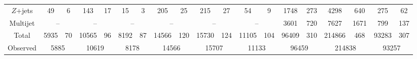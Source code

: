 \begin{table}[tbp]
\begin{center}
{\begin{tabular}{| c | c@{\ $\pm$\ }c c@{\ $\pm$\ }c c@{\ $\pm$\ }c | c@{\ $\pm$\ }c  c@{\ $\pm$\ }c c@{\ $\pm$\ }c | c@{\ $\pm$\ }c  c@{\ $\pm$\ }c c@{\ $\pm$\ }c |}
				$Z$+jets&                     49 &           6&                    143 &          17&                     15 &           3&                    205 &          25&                    215 &          27&                     54 &           9&                   1748 &         273&                   4298 &         640&                    275 &          62\\
				Multijet&\multicolumn{2}{c}{   --}             &\multicolumn{2}{c}{   --}             &\multicolumn{2}{c|}{   --}             &\multicolumn{2}{c}{   --}             &\multicolumn{2}{c}{   --}             &\multicolumn{2}{c|}{   --}             &                   3601 &         720&                   7627 &        1671&                    799 &         137\\
				\hline
				Total&                   5935 &          70&                  10565 &          96&                   8192 &          87&                  14566 &         120&                  15730 &         124&                  11105 &         104&                  96409 &         310&                 214866 &         468&                  93283 &         307\\
				\hline
				Observed&\multicolumn{2}{c}{5885}             &\multicolumn{2}{c}{10619}             &\multicolumn{2}{c|}{8178}             &\multicolumn{2}{c}{14566}             &\multicolumn{2}{c}{15707}             &\multicolumn{2}{c|}{11133}             &\multicolumn{2}{c}{96459}             &\multicolumn{2}{c}{214838}             &\multicolumn{2}{c|}{93257}             \\
				\hline
				\hline
			\end{tabular}
		}
		\label{tab:yields_WW}
	\end{center}
\end{table}



